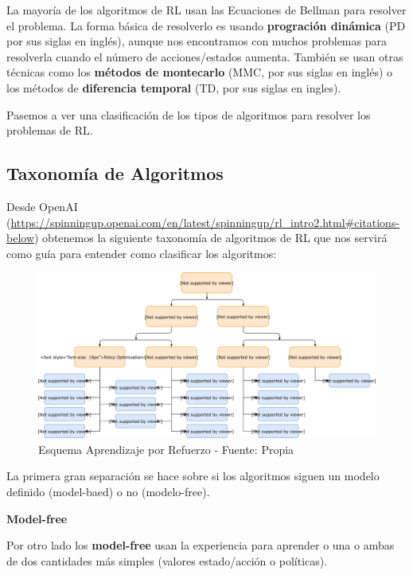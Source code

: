 \documentclass[
  a4paper,
  DIV=11,
  numbers=noendperiod]{scrreprt}
\begin{document}
La mayoría de los algoritmos de RL usan las Ecuaciones de Bellman para
resolver el problema. La forma básica de resolverlo es usando
\textbf{progración dinámica} (PD por sus siglas en inglés), aunque nos
encontramos con muchos problemas para resolverla cuando el número de
acciones/estados aumenta. También se usan otras técnicas como los
\textbf{métodos de montecarlo} (MMC, por sus siglas en inglés) o los
métodos de \textbf{diferencia temporal} (TD, por sus siglas en ingles).

Pasemos a ver una clasificación de los tipos de algoritmos para resolver
los problemas de RL.

\hypertarget{taxonomuxeda-de-algoritmos}{%
\subsection{Taxonomía de Algoritmos}\label{taxonomuxeda-de-algoritmos}}

Desde OpenAI
(\url{https://spinningup.openai.com/en/latest/spinningup/rl_intro2.html\#citations-below})
obtenemos la siguiente taxonomía de algoritmos de RL que nos servirá
como guía para entender como clasificar los algoritmos:

\begin{figure}

{\centering \includegraphics[width=1\textwidth,height=\textheight]{imagenes/reinforcement_learning/rl_algorithms.png}

}

\caption{Esquema Aprendizaje por Refuerzo - Fuente: Propia}

\end{figure}

La primera gran separación se hace sobre si los algoritmos siguen un
modelo definido (model-baed) o no (modelo-free).

\textbf{Model-free}

Por otro lado los \textbf{model-free} usan la experiencia para aprender
o una o ambas de dos cantidades más simples (valores estado/acción o
políticas).
\end{document}
